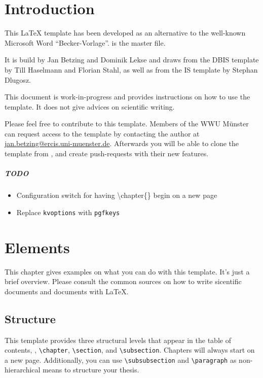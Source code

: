 
\chapter{Introduction}
This \LaTeX \- template has been developed as an alternative to the well-known Microsoft Word \enquote{Becker-Vorlage}.  is the master file.

It is build by  Jan Betzing and Dominik Lekse and draws from the DBIS template by Till Haselmann and Florian Stahl, as well as from the IS template by Stephan Dlugosz.

This document is work-in-progress and provides instructions on how to use the template. It does not give advices on scientific writing.

Please feel free to contribute to this template. Members of the WWU M\"{u}nster can request access to the template by contacting the author at \href{mailto:jan.betzing@ercis.uni-muenster.de}{jan.betzing@ercis.uni-muenster.de}. Afterwards you will be able to clone the template from , and create push-requests with their new features.

\paragraph{TODO}
\begin{itemize}
	\item Configuration switch for having \textbackslash chapter\{\} begin on a new page
	\item Replace \texttt{kvoptions} with \texttt{pgfkeys}
\end{itemize}
\chapter{Elements}
This chapter gives examples on what you can do with this template. It's just a brief overview. Please consult the common sources on how to write sicentific documents and documents with \LaTeX.

\section{Structure}
This template provides three structural levels that appear in the table of contents, \viz, \texttt{\textbackslash chapter}, \texttt{\textbackslash section}, and \texttt{\textbackslash subsection}. Chapters will always start on a new page. Additionally, you can use \texttt{\textbackslash subsubsection} and \texttt{\textbackslash paragraph} as non-hierarchical means to structure your thesis.


